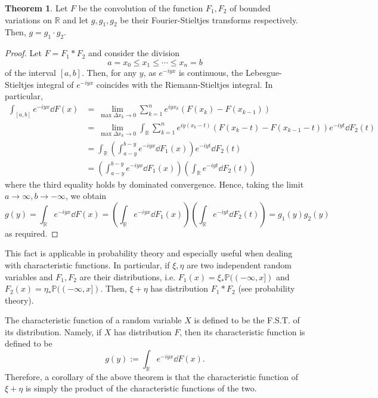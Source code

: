 \documentclass[]{article}
\theoremstyle{definition}
\newtheorem{theorem}{Theorem}
\theoremstyle{definition}
\begin{document}
\begin{theorem}
  Let \(F\) be the convolution of the function \(F_1, F_2\) of bounded 
  variations on \(\mathbb{R}\) and let \(g, g_1, g_2\) be their Fourier-Stieltjes 
  transforms respectively. Then, \(g = g_1 \cdot g_2\).
\end{theorem}
\begin{proof}
  Let \(F = F_1 * F_2\) and consider the division 
  \[a = x_0 \le x_1 \le \cdots \le x_n = b\]
  of the interval \([a, b]\). Then, for any \(y\), as \(e^{-iyx}\) is continuous,
  the Lebesgue-Stieltjes integral of \(e^{-iyx}\) coincides with the 
  Riemann-Stieltjes integral. In particular, 
  \[\begin{split}
    \int_{[a, b]} e^{-iyx} \dd F(x) 
    & = \lim_{\max \Delta x_k \to 0} \sum_{k = 1}^n e^{iyx_k} (F(x_k) - F(x_{k - 1}))\\
    & = \lim_{\max \Delta x_k \to 0} \int_{\mathbb{R}}\sum_{k = 1}^n e^{iy(x_k - t)} 
      (F(x_k - t) - F(x_{k - 1} - t)) e^{-iyt} \dd F_2(t)\\
    & = \int_{\mathbb{R}} \left(\int_{a - y}^{b - y} e^{-iyx}\dd F_1(x)\right)
      e^{-iyt} \dd F_2(t)\\
    & = \left(\int_{a - y}^{b - y} e^{-iyx}\dd F_1(x)\right)
      \left(\int_{\mathbb{R}} e^{-iyt} \dd F_2(t)\right)
  \end{split}\]
  where the third equality holds by dominated convergence. Hence, 
  taking the limit \(a \to \infty, b \to -\infty\), we obtain 
  \[g(y) = \int_{\mathbb{R}} e^{-iyx} \dd F(x) 
    = \left(\int_{\mathbb{R}} e^{-iyx}\dd F_1(x)\right)
    \left(\int_{\mathbb{R}} e^{-iyt} \dd F_2(t)\right) = g_1(y)g_2(y)\]
  as required.
\end{proof}

This fact is applicable in probability theory and especially useful when dealing 
with characteristic functions. In particular, if \(\xi, \eta\) are two independent 
random variables and \(F_1, F_2\) are their distributions, i.e. 
\(F_1(x) = \xi_* \mathbb{P}((-\infty, x])\) and \(F_2(x) = \eta_* \mathbb{P}((-\infty, x])\).
Then, \(\xi + \eta\) has distribution \(F_1 * F_2\) (see probability theory).

The characteristic function of a random variable \(X\) is defined to be the 
F.S.T. of its distribution. Namely, if \(X\) has distribution \(F\), 
then its characteristic function is defined to be 
\[g(y) := \int_{\mathbb{R}} e^{-i y x} \dd F(x).\]
Therefore, a corollary of the above theorem is that the characteristic function 
of \(\xi + \eta\) is simply the product of the characteristic functions of the 
two.
\end{document}

